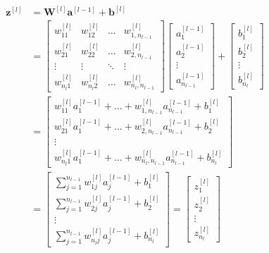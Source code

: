 \begin{equation}
\begin{aligned}
    \mathbf{z}^{[l]} &= \mathbf{W}^{[l]} \mathbf{a}^{[l-1]} + \mathbf{b}^{[l]} \\
    &= \begin{bmatrix}
        w_{11}^{[l]} & w_{12}^{[l]} & \dots & w_{1, n_{l-1}}^{[l]} \\
        w_{21}^{[l]} & w_{22}^{[l]} & \dots & w_{2, n_{l-1}}^{[l]} \\
        \vdots & \vdots & \ddots & \vdots \\
        w_{n_l 1}^{[l]} & w_{n_l 2}^{[l]} & \dots & w_{n_l, n_{l-1}}^{[l]}
    \end{bmatrix}
    \begin{bmatrix}
        a_1^{[l-1]} \\
        a_2^{[l-1]} \\
        \vdots \\
        a_{n_{l-1}}^{[l-1]}
    \end{bmatrix}
    +
    \begin{bmatrix}
        b_1^{[l]} \\
        b_2^{[l]} \\
        \vdots \\
        b_{n_l}^{[l]}
    \end{bmatrix} \\
    &= \begin{bmatrix}
        w_{11}^{[l]} a_1^{[l-1]} + \dots + w_{1, n_{l-1}}^{[l]} a_{n_{l-1}}^{[l-1]} + b_1^{[l]} \\
        w_{21}^{[l]} a_1^{[l-1]} + \dots + w_{2, n_{l-1}}^{[l]} a_{n_{l-1}}^{[l-1]} + b_2^{[l]} \\
        \vdots \\
        w_{n_l 1}^{[l]} a_1^{[l-1]} + \dots + w_{n_l, n_{l-1}}^{[l]} a_{n_{l-1}}^{[l-1]} + b_{n_l}^{[l]}
    \end{bmatrix} \\
    &= \begin{bmatrix}
        \sum_{j=1}^{n_{l-1}} w_{1j}^{[l]} a_j^{[l-1]} + b_1^{[l]} \\
        \sum_{j=1}^{n_{l-1}} w_{2j}^{[l]} a_j^{[l-1]} + b_2^{[l]} \\
        \vdots \\
        \sum_{j=1}^{n_{l-1}} w_{n_l j}^{[l]} a_j^{[l-1]} + b_{n_l}^{[l]}
    \end{bmatrix}
    = \begin{bmatrix}
        z_1^{[l]} \\
        z_2^{[l]} \\
        \vdots \\
        z_{n_l}^{[l]}
    \end{bmatrix}
\end{aligned}
\label{f-z}
\end{equation}
